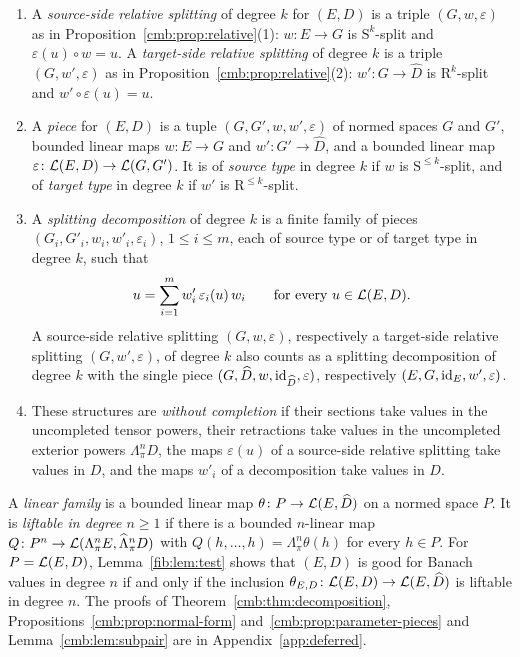 \begin{definition}\label{cmb:def:decomposition}
\begin{enumerate}
\item A \emph{source-side relative splitting} of degree $k$ for $(E,D)$ is a triple $(G,w,\varepsilon)$ as in
Proposition~\ref{cmb:prop:relative}(1): $w\colon E\to G$ is $\mathrm S^k$-split and $\varepsilon(u)\circ w=u$. A
\emph{target-side relative splitting} of degree $k$ is a triple $(G,w',\varepsilon)$ as in
Proposition~\ref{cmb:prop:relative}(2): $w'\colon G\to\widehat D$ is $\mathrm R^k$-split and $w'\circ\varepsilon(u)=u$.
\item A \emph{piece} for $(E,D)$ is a tuple $(G,G',w,w',\varepsilon)$ of normed spaces $G$ and $G'$, bounded linear maps
$w\colon E\to G$ and $w'\colon G'\to\widehat D$, and a bounded linear map $\varepsilon\colon\mathcal L(E,D)\to\mathcal L(G,G')$. It is
of \emph{source type} in degree $k$ if $w$ is $\mathrm S^{\le k}$-split, and of \emph{target type} in degree $k$ if
$w'$ is $\mathrm R^{\le k}$-split.
\item A \emph{splitting decomposition} of degree $k$ is a finite family of pieces $(G_i,G'_i,w_i,w'_i,\varepsilon_i)$,
$1\le i\le m$, each of source type or of target type in degree $k$, such that
\begin{equation}\label{cmb:eq:decomposition}
 u=\sum_{i=1}^mw'_i\,\varepsilon_i(u)\,w_i\qquad\text{for every }u\in\mathcal L(E,D).
\end{equation}
A source-side relative splitting $(G,w,\varepsilon)$, respectively a target-side relative splitting
$(G,w',\varepsilon)$, of degree $k$ also counts as a splitting decomposition of degree $k$ with the single piece
$(G,\widehat D,w,\mathrm{id}_{\widehat D},\varepsilon)$, respectively $(E,G,\mathrm{id}_E,w',\varepsilon)$.
\item These structures are \emph{without completion} if their sections take values in the uncompleted tensor powers,
their retractions take values in the uncompleted exterior powers $\Lambda^n_\pi D$, the maps $\varepsilon(u)$ of a
source-side relative splitting take values in $D$, and the maps $w'_i$ of a decomposition take values in $D$.
\end{enumerate}
\end{definition}

A \emph{linear family} is a bounded linear map $\theta\colon P\to\mathcal L(E,\widehat D)$ on a normed space $P$. It is
\emph{liftable in degree $n\ge1$} if there is a bounded $n$-linear map
$Q\colon P^n\to\mathcal L(\Lambda^n_\pi E,\widehat\Lambda^n_\pi D)$ with $Q(h,\dots,h)=\Lambda^n_\pi\theta(h)$ for every $h\in P$.
For $P=\mathcal L(E,D)$, Lemma~\ref{fib:lem:test} shows that $(E,D)$ is good for Banach values in degree $n$ if and only if the
inclusion $\theta_{E,D}\colon\mathcal L(E,D)\to\mathcal L(E,\widehat D)$ is liftable in degree $n$. The proofs of
Theorem~\ref{cmb:thm:decomposition}, Propositions~\ref{cmb:prop:normal-form} and~\ref{cmb:prop:parameter-pieces} and
Lemma~\ref{cmb:lem:subpair} are in Appendix~\ref{app:deferred}.

